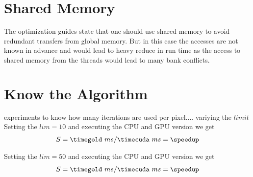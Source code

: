 \section{Shared Memory} %
\label{sec:shared_memory}
The optimization guides state that one should use shared memory to avoid 
redundant transfers from global memory. But in this case the accesses are not 
known in advance and would lead to heavy reduce in run time as the access to 
shared memory from the threads would lead to many bank conflicts. 

\section{Know the Algorithm} %
\label{sec:know_the_algo}

experiments to know how many iterations are used per pixel.... 
variying the $limit$
Setting the $lim = 10$ and executing the \gls{CPU} and \gls{GPU} version we get
\fpDiv{\speedup}{\tgold}{\tcuda}
\begin{equation*}\label{eq:speedup0}
	S = \timegold\ ms/\timecuda\ ms = \speedup
\end{equation*}


Setting the $lim = 50$ and executing the \gls{CPU} and \gls{GPU} version we get
\fpDiv{\speedup}{\tgold}{\tcuda}
\begin{equation*}\label{eq:speedup0}
	S = \timegold\ ms/\timecuda\ ms = \speedup
\end{equation*}


